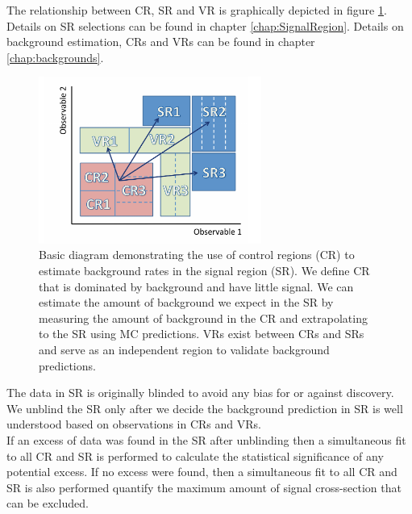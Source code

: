 \indent The relationship between CR, SR and VR is graphically depicted in figure \ref{fig:CR_VR_SR_stat1}.  Details on SR selections can be found in chapter \ref{chap:SignalRegion}.  Details on background estimation, CRs and VRs can be found in chapter \ref{chap:backgrounds}. \\

\begin{figure}[h!]
  \centering
	\includegraphics[width=0.65\textwidth]{./figures/statistics/CR_VR_SR.pdf}
\caption{Basic diagram demonstrating the use of control regions (CR) to estimate background rates in the signal region (SR).  We define CR that is dominated by background and have little signal.  We can estimate the amount of background we expect in the SR by measuring the amount of background in the CR and extrapolating to the SR using MC predictions. VRs exist between CRs and SRs and serve as an independent region to validate background predictions.  }
\label{fig:CR_VR_SR_stat1}
\end{figure}

\indent The data in SR is originally blinded to avoid any bias for or against discovery.  We unblind the SR only after we decide the background prediction in SR is well understood based on observations in CRs and VRs. \\

\indent If an excess of data was found in the SR after unblinding then a simultaneous fit to all CR and SR is performed to calculate the statistical significance of any potential excess.   If no excess were found, then a simultaneous fit to all CR and SR is also performed quantify the maximum amount of signal cross-section that can be excluded.  \\

